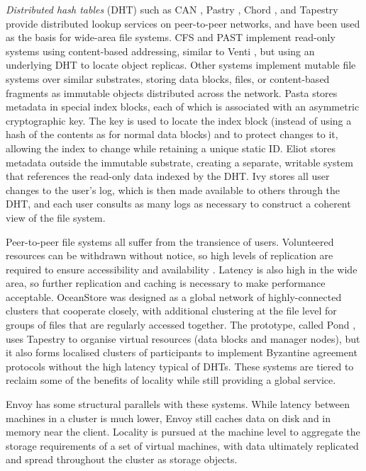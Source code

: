 \emph{Distributed hash tables} (DHT) such as CAN \cite{ratnasamy}, Pastry \cite{rowstron01b}, Chord \cite{stoica}, and Tapestry \cite{zhao01} provide distributed lookup services on peer-to-peer networks, and have been used as the basis for wide-area file systems. CFS \cite{dabek} and PAST \cite{rowstron01a} implement read-only systems using content-based addressing, similar to Venti \cite{quinlan}, but using an underlying DHT to locate object replicas. Other systems implement mutable file systems over similar substrates, storing data blocks, files, or content-based fragments \cite{rabin81} as immutable objects distributed across the network. Pasta \cite{moreton} stores metadata in special index blocks, each of which is associated with an asymmetric cryptographic key. The key is used to locate the index block (instead of using a hash of the contents as for normal data blocks) and to protect changes to it, allowing the index to change while retaining a unique static ID. Eliot \cite{stein02} stores metadata outside the immutable substrate, creating a separate, writable system that references the read-only data indexed by the DHT. Ivy \cite{muthitacharoen02} stores all user changes to the user's log, which is then made available to others through the DHT, and each user consults as many logs as necessary to construct a coherent view of the file system.

Peer-to-peer file systems all suffer from the transience of users. Volunteered resources can be withdrawn without notice, so high levels of replication are required to ensure accessibility and availability \cite{blake,rabin89}. Latency is also high in the wide area, so further replication and caching is necessary to make performance acceptable. OceanStore \cite{kubiatowicz} was designed as a global network of highly-connected clusters that cooperate closely, with additional clustering at the file level for groups of files that are regularly accessed together. The prototype, called Pond \cite{rhea}, uses Tapestry to organise virtual resources (data blocks and manager nodes), but it also forms localised clusters of participants to implement Byzantine agreement protocols without the high latency typical of DHTs. These systems are tiered to reclaim some of the benefits of locality while still providing a global service.

Envoy has some structural parallels with these systems. While latency between machines in a cluster is much lower, Envoy still caches data on disk and in memory near the client. Locality is pursued at the machine level to aggregate the storage requirements of a set of virtual machines, with data ultimately replicated and spread throughout the cluster as storage objects.

